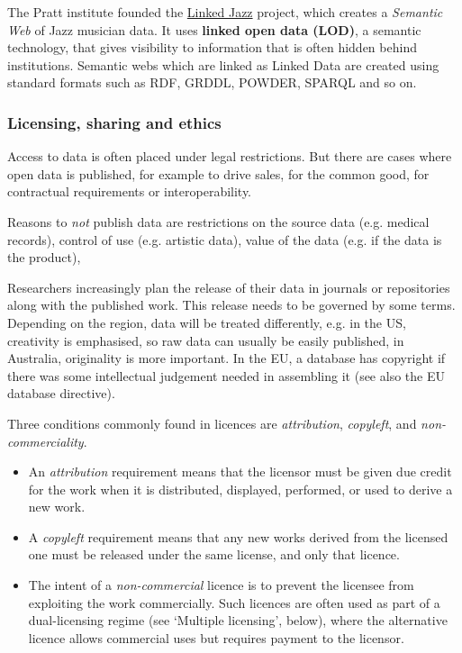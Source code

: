 The Pratt institute founded the \href{https://linkedjazz.org/}{Linked Jazz} project, which creates a \textit{Semantic Web} of Jazz musician data. It uses \textbf{linked open data (LOD)}, a semantic technology, that gives visibility to information that is often hidden behind institutions. Semantic webs which are linked as Linked Data are created using standard formats such as RDF, GRDDL, POWDER, SPARQL and so on.

\subsubsection{Licensing, sharing and ethics}

Access to data is often placed under legal restrictions. But there are cases where open data is published, for example to drive sales, for the common good,  for contractual requirements or interoperability.

Reasons to \textit{not} publish data are restrictions on the source data (e.g. medical records), control of use (e.g. artistic data), value of the data (e.g. if the data is the product), 

Researchers increasingly plan the release of their data in journals or repositories along with the published work. This release needs to be governed by some terms. Depending on the region, data will be treated differently, e.g. in the US, creativity is emphasised, so raw data can usually be easily published, in Australia, originality is more important. In the EU, a database has copyright if there was some intellectual judgement needed in assembling it (see also the EU database directive).

Three conditions commonly found in licences are \textit{attribution}, \textit{copyleft}, and \textit{non-commerciality}.

\begin{itemize}
    \item An \textit{attribution} requirement means that the licensor must be given due credit for the work when it is distributed, displayed, performed, or used to derive a new work.
    \item A \textit{copyleft} requirement means that any new works derived from the licensed one must be released under the same license, and only that licence.
    \item The intent of a \textit{non-commercial} licence is to prevent the licensee from exploiting the work commercially. Such licences are often used as part of a dual-licensing regime (see ‘Multiple licensing’, below), where the alternative licence allows commercial uses but requires payment to the licensor.
\end{itemize}


